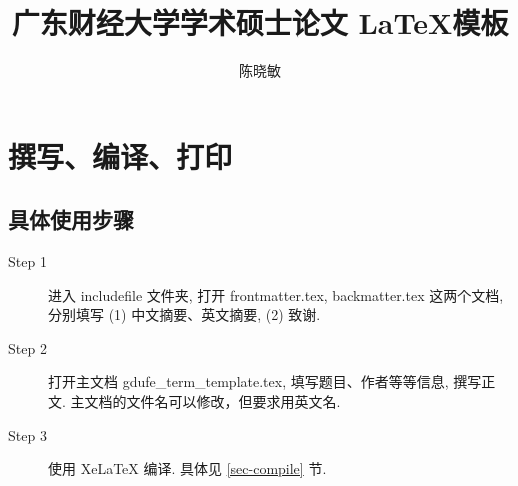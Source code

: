\documentclass[class = professional]{gdufe_master_thesis}
\begin{document}
\title{广东财经大学学术硕士论文 \LaTeX 模板}
\author{陈晓敏}
\maketitle
{}         %

\frontmatter
\tableofcontents
\mainmatter
\pagestyle{master-mainmatter}
\chapter{撰写、编译、打印}

\section{具体使用步骤}

\begin{description}

    \item[Step 1]  进入 includefile 文件夹,  打开 frontmatter.tex, backmatter.tex 这两个文档,
          分别填写 (1) 中文摘要、英文摘要, (2) 致谢.

    \item[Step 2]  打开主文档 gdufe\_term\_template.tex, 填写题目、作者等等信息, 撰写正文. 主文档的文件名可以修改，但要求用英文名.

    \item[Step 3]  使用 XeLaTeX 编译. 具体见 \ref{sec-compile} 节.

\end{description}
\end{document}
